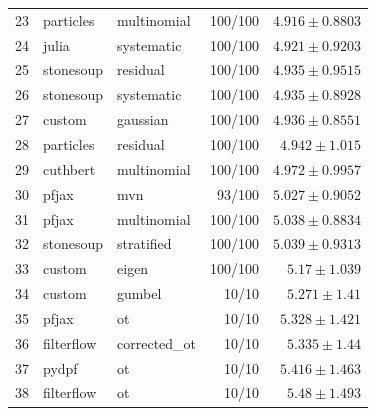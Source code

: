 \begin{table}[!htbp]
\begin{tabular}{rllrr}
23 & particles & multinomial & 100/100 & $4.916 \pm 0.8803$ \\
24 & julia & systematic & 100/100 & $4.921 \pm 0.9203$ \\
25 & stonesoup & residual & 100/100 & $4.935 \pm 0.9515$ \\
26 & stonesoup & systematic & 100/100 & $4.935 \pm 0.8928$ \\
27 & custom & gaussian & 100/100 & $4.936 \pm 0.8551$ \\
28 & particles & residual & 100/100 & $4.942 \pm 1.015$ \\
29 & cuthbert & multinomial & 100/100 & $4.972 \pm 0.9957$ \\
30 & pfjax & mvn & 93/100 & $5.027 \pm 0.9052$ \\
31 & pfjax & multinomial & 100/100 & $5.038 \pm 0.8834$ \\
32 & stonesoup & stratified & 100/100 & $5.039 \pm 0.9313$ \\
33 & custom & eigen & 100/100 & $5.17 \pm 1.039$ \\
34 & custom & gumbel & 10/10 & $5.271 \pm 1.41$ \\
35 & pfjax & ot & 10/10 & $5.328 \pm 1.421$ \\
36 & filterflow & corrected\_ot & 10/10 & $5.335 \pm 1.44$ \\
37 & pydpf & ot & 10/10 & $5.416 \pm 1.463$ \\
38 & filterflow & ot & 10/10 & $5.48 \pm 1.493$ \\
\bottomrule
\end{tabular}
\end{table}

